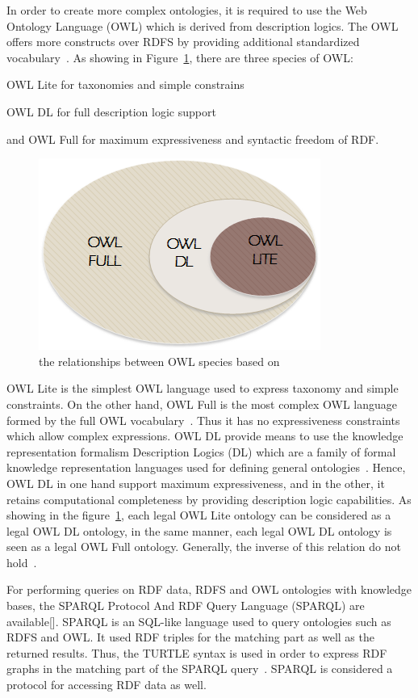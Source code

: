 In order to create more complex ontologies, it is required to use the Web Ontology Language (OWL) which is derived from description logics. The OWL offers more constructs over RDFS by providing additional standardized vocabulary~\cite{owl}. As showing in Figure~\ref{fig:contrib2:owl}, there are three species of OWL:
\begin{inlinelist}
  \item OWL Lite for taxonomies and simple constrains
  \item OWL DL for full description logic support
  \item and OWL Full for maximum expressiveness and syntactic freedom of RDF.~\cite{owl}
\end{inlinelist}\par 
\begin{figure}[htbp]
    \centering
    \includegraphics[width=.5\textwidth]{resources/images/owl}
    \caption{the relationships between OWL species based on~\cite{owlpic}}\label{fig:contrib2:owl}
\end{figure}
OWL Lite is the simplest OWL language used to express taxonomy and simple constraints. On the other hand, OWL Full is the most complex OWL language formed by the full OWL vocabulary~\cite{owl}. Thus it has no expressiveness constraints which allow complex expressions. OWL DL provide means to use the knowledge representation formalism Description Logics (DL) which are a family of formal knowledge representation languages used for defining general ontologies~\cite{dl}. Hence, OWL DL in one hand support maximum expressiveness, and in the other, it retains computational completeness by providing description logic capabilities. As showing in the figure~\ref{fig:contrib2:owl}, each legal OWL Lite ontology can be considered as a legal OWL DL ontology, in the same manner, each legal OWL DL ontology is seen as a legal OWL Full ontology. Generally, the inverse of this relation do not hold~\cite{owlpic}.\par 

For performing queries on RDF data, RDFS and OWL ontologies with knowledge bases, the SPARQL Protocol And RDF Query Language (SPARQL) are available[]. SPARQL is an SQL-like language used to query ontologies such as RDFS and OWL. It used RDF triples for the matching part as well as the returned results. Thus, the TURTLE syntax is used in order to express RDF graphs in the matching part of the SPARQL query~\cite{thesis}. SPARQL is considered a protocol for accessing RDF data as well.\par 
 

